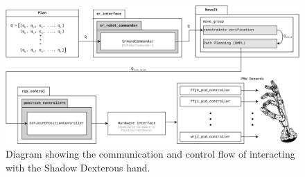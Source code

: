 \begin{figure}[h]
		\begin{center}
			\includegraphics[width=\textwidth]{chapters/system-setup/fig/hand-communication-architecture-crop.pdf}
		\end{center}
		\caption{Diagram showing the communication and control flow of interacting with the Shadow Dexterous hand.}
		\label{fig:hand-communication-architecture}
\end{figure}